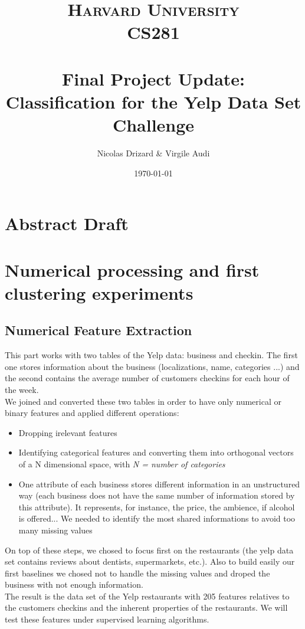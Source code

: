 \documentclass[paper=a4, fontsize=11pt]{scrartcl} %
\title{	
\normalfont \normalsize 
\textsc{Harvard University} \\[25pt]
\textsc{CS281} \\[25pt]
\horrule{0.5pt} \\[0.4cm] 
\huge Final Project Update: \\
\huge Classification for the Yelp Data Set Challenge
\horrule{2pt} \\[0.5cm]
}
\author{Nicolas Drizard \& Virgile Audi}
\date{\normalsize\today}
\numberwithin{equation}{section}
\numberwithin{figure}{section}
\numberwithin{table}{section}
\begin{document}
\maketitle

\section{Abstract Draft}

\section{Numerical processing and first clustering experiments}

\subsection{Numerical Feature Extraction}

This part works with two tables of the Yelp data: business and checkin. The first one stores information about the business (localizations, name, categories ...) and the second contains the average number of customers checkins for each hour of the week.\\

We joined and converted these two tables in order to have only numerical or binary features and applied different operations:
\begin{itemize}
	\item Dropping irelevant features
	\item Identifying categorical features and converting them into orthogonal vectors of a N dimensional space, with  \textit{N = number of categories}
	\item One attribute of each business stores different information in an unstructured way (each business does not have the same number of information stored by this attribute). It  represents, for instance, the price, the ambience, if alcohol is offered... We needed to identify the most shared informations to avoid too many missing values
\end{itemize}
On top of these steps, we chosed to focus first on the restaurants (the yelp data set contains reviews about dentists, supermarkets, etc.). Also to build easily our first baselines we chosed not to handle the missing values and droped the business with not enough information.\\

The result is the data set of the Yelp restaurants with 205 features relatives to the customers checkins and the inherent properties of the restaurants. We will test these features under supervised learning algorithms.\\
\end{document}
